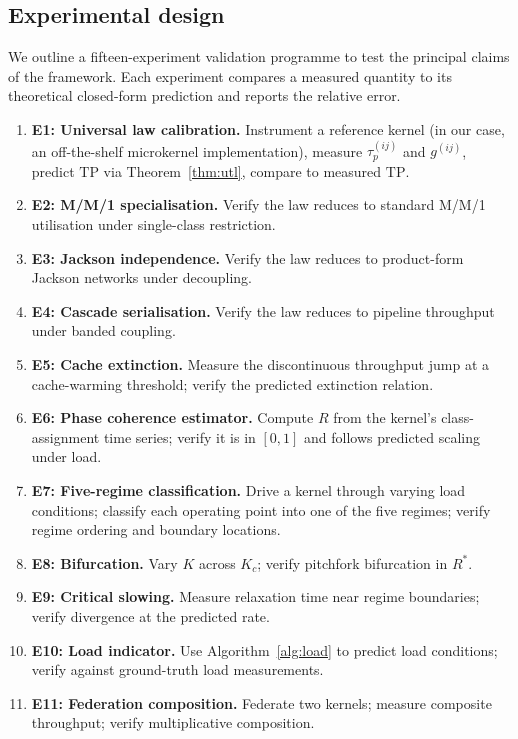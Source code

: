 \documentclass[twocolumn,11pt,a4paper]{article}
\newcommand{\TP}{\mathrm{TP}}
\newcommand{\taup}{\tau_p}
\newcommand{\Rens}{R}
\begin{document}
\subsection{Experimental design}

We outline a fifteen-experiment validation programme to test the principal claims of the framework. Each experiment compares a measured quantity to its theoretical closed-form prediction and reports the relative error.

\begin{enumerate}[nosep,leftmargin=*]
\item \textbf{E1: Universal law calibration.} Instrument a reference kernel (in our case, an off-the-shelf microkernel implementation), measure $\taup^{(ij)}$ and $g^{(ij)}$, predict $\TP$ via Theorem~\ref{thm:utl}, compare to measured $\TP$.
\item \textbf{E2: M/M/1 specialisation.} Verify the law reduces to standard M/M/1 utilisation under single-class restriction.
\item \textbf{E3: Jackson independence.} Verify the law reduces to product-form Jackson networks under decoupling.
\item \textbf{E4: Cascade serialisation.} Verify the law reduces to pipeline throughput under banded coupling.
\item \textbf{E5: Cache extinction.} Measure the discontinuous throughput jump at a cache-warming threshold; verify the predicted extinction relation.
\item \textbf{E6: Phase coherence estimator.} Compute $\Rens$ from the kernel's class-assignment time series; verify it is in $[0,1]$ and follows predicted scaling under load.
\item \textbf{E7: Five-regime classification.} Drive a kernel through varying load conditions; classify each operating point into one of the five regimes; verify regime ordering and boundary locations.
\item \textbf{E8: Bifurcation.} Vary $K$ across $K_c$; verify pitchfork bifurcation in $\Rens^*$.
\item \textbf{E9: Critical slowing.} Measure relaxation time near regime boundaries; verify divergence at the predicted rate.
\item \textbf{E10: Load indicator.} Use Algorithm~\ref{alg:load} to predict load conditions; verify against ground-truth load measurements.
\item \textbf{E11: Federation composition.} Federate two kernels; measure composite throughput; verify multiplicative composition.

\end{enumerate}
\end{document}
